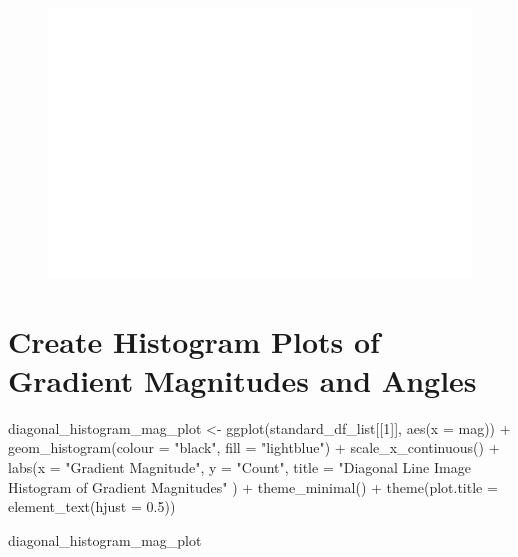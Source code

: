 \documentclass[
  letterpaper,
]{report}
\newenvironment{Shaded}{\begin{snugshade}}{\end{snugshade}}
\newcommand{\AttributeTok}[1]{\textcolor[rgb]{0.40,0.45,0.13}{#1}}
\newcommand{\DecValTok}[1]{\textcolor[rgb]{0.68,0.00,0.00}{#1}}
\newcommand{\FloatTok}[1]{\textcolor[rgb]{0.68,0.00,0.00}{#1}}
\newcommand{\FunctionTok}[1]{\textcolor[rgb]{0.28,0.35,0.67}{#1}}
\newcommand{\NormalTok}[1]{\textcolor[rgb]{0.00,0.23,0.31}{#1}}
\newcommand{\OtherTok}[1]{\textcolor[rgb]{0.00,0.23,0.31}{#1}}
\newcommand{\SpecialCharTok}[1]{\textcolor[rgb]{0.37,0.37,0.37}{#1}}
\newcommand{\StringTok}[1]{\textcolor[rgb]{0.13,0.47,0.30}{#1}}
\begin{document}
\begin{figure}[H]

{\centering \includegraphics{results_files/figure-pdf/unnamed-chunk-8-2.pdf}

}

\end{figure}

\hypertarget{create-histogram-plots-of-gradient-magnitudes-and-angles}{%
\section{Create Histogram Plots of Gradient Magnitudes and
Angles}\label{create-histogram-plots-of-gradient-magnitudes-and-angles}}

\begin{Shaded}
\begin{Highlighting}[]
\NormalTok{diagonal\_histogram\_mag\_plot }\OtherTok{\textless{}{-}}
  \FunctionTok{ggplot}\NormalTok{(standard\_df\_list[[}\DecValTok{1}\NormalTok{]], }
         \FunctionTok{aes}\NormalTok{(}\AttributeTok{x =}\NormalTok{ mag)) }\SpecialCharTok{+}
  \FunctionTok{geom\_histogram}\NormalTok{(}\AttributeTok{colour =} \StringTok{"black"}\NormalTok{, }\AttributeTok{fill =} \StringTok{"lightblue"}\NormalTok{) }\SpecialCharTok{+}
  \FunctionTok{scale\_x\_continuous}\NormalTok{() }\SpecialCharTok{+} 
  \FunctionTok{labs}\NormalTok{(}\AttributeTok{x =} \StringTok{"Gradient Magnitude"}\NormalTok{, }
       \AttributeTok{y =} \StringTok{"Count"}\NormalTok{, }
       \AttributeTok{title =} \StringTok{"Diagonal Line Image Histogram of Gradient Magnitudes"}
\NormalTok{       ) }\SpecialCharTok{+}
  \FunctionTok{theme\_minimal}\NormalTok{() }\SpecialCharTok{+}
  \FunctionTok{theme}\NormalTok{(}\AttributeTok{plot.title =} \FunctionTok{element\_text}\NormalTok{(}\AttributeTok{hjust =} \FloatTok{0.5}\NormalTok{))}

\NormalTok{diagonal\_histogram\_mag\_plot}
\end{Highlighting}
\end{Shaded}
\end{document}

